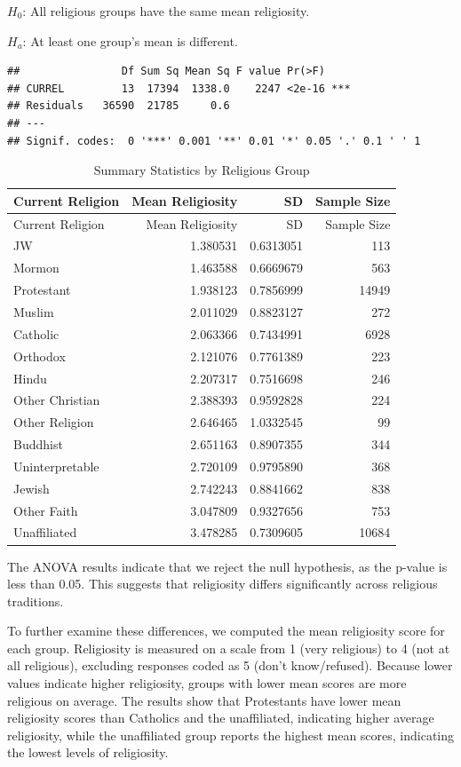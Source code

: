 \documentclass[
]{article}
\begin{document}
\(H_0\): All religious groups have the same mean religiosity.

\(H_a\): At least one group's mean is different.

\begin{verbatim}
##                Df Sum Sq Mean Sq F value Pr(>F)    
## CURREL         13  17394  1338.0    2247 <2e-16 ***
## Residuals   36590  21785     0.6                   
## ---
## Signif. codes:  0 '***' 0.001 '**' 0.01 '*' 0.05 '.' 0.1 ' ' 1
\end{verbatim}

\begin{longtable}[]{@{}lrrr@{}}
\caption{Summary Statistics by Religious Group}\tabularnewline
\toprule\noalign{}
Current Religion & Mean Religiosity & SD & Sample Size \\
\midrule\noalign{}
\endfirsthead
\toprule\noalign{}
Current Religion & Mean Religiosity & SD & Sample Size \\
\midrule\noalign{}
\endhead
\bottomrule\noalign{}
\endlastfoot
JW & 1.380531 & 0.6313051 & 113 \\
Mormon & 1.463588 & 0.6669679 & 563 \\
Protestant & 1.938123 & 0.7856999 & 14949 \\
Muslim & 2.011029 & 0.8823127 & 272 \\
Catholic & 2.063366 & 0.7434991 & 6928 \\
Orthodox & 2.121076 & 0.7761389 & 223 \\
Hindu & 2.207317 & 0.7516698 & 246 \\
Other Christian & 2.388393 & 0.9592828 & 224 \\
Other Religion & 2.646465 & 1.0332545 & 99 \\
Buddhist & 2.651163 & 0.8907355 & 344 \\
Uninterpretable & 2.720109 & 0.9795890 & 368 \\
Jewish & 2.742243 & 0.8841662 & 838 \\
Other Faith & 3.047809 & 0.9327656 & 753 \\
Unaffiliated & 3.478285 & 0.7309605 & 10684 \\
\end{longtable}

The ANOVA results indicate that we reject the null hypothesis, as the
p-value is less than 0.05. This suggests that religiosity differs
significantly across religious traditions.

To further examine these differences, we computed the mean religiosity
score for each group. Religiosity is measured on a scale from 1 (very
religious) to 4 (not at all religious), excluding responses coded as 5
(don't know/refused). Because lower values indicate higher religiosity,
groups with lower mean scores are more religious on average. The results
show that Protestants have lower mean religiosity scores than Catholics
and the unaffiliated, indicating higher average religiosity, while the
unaffiliated group reports the highest mean scores, indicating the
lowest levels of religiosity.
\end{document}
